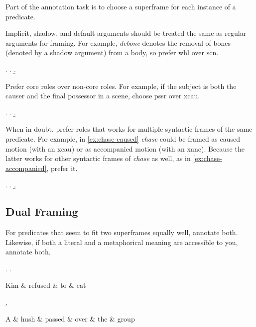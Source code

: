 \documentclass[a4paper]{article}
\begin{document}
Part of the annotation task is to choose a superframe for each instance of a predicate.

Implicit, shadow, and default arguments \citep{di-fabio-etal-2019-verbatlas} should
be treated the same as regular arguments for framing. For example,
\emph{debone} denotes the removal of bones (denoted by a shadow argument) from
a body, so prefer \textsf{whl} over \textsf{scn}.

\ex. \a. 
     \b. 


Prefer core roles over non-core roles. For example, if the subject is both the causer and the final possessor in a scene, choose \textsf{pssr} over \textsf{xcau}.

\ex. \a. 
     \b. 

When in doubt, prefer roles that works for multiple syntactic frames of the
same predicate. For example, in \ref{ex:chase-caused} \emph{chase} could be
framed as caused motion (with an \textsf{xcau}) or as accompanied motion (with
an \textsf{xanc}). Because the latter works for other syntactic frames of
\emph{chase} as well, as in \ref{ex:chase-accompanied}, prefer it.

\ex. \a. \label{ex:chase-caused} 
     \b. \label{ex:chase-accompanied} 

\subsection{Dual Framing}

For predicates that seem to fit two superframes equally well, annotate both. Likewise, if both a literal and a metaphorical meaning are accessible to you, annotate both.

\ex.
\a. \begin{dependency}
    \begin{deptext}
        Kim \& refused \& to \& eat \\
    \end{deptext}
\end{dependency}
\b. \begin{dependency}
    \begin{deptext}
        A \& hush \& passed \& over \& the \& group \\
    \end{deptext}
\end{dependency}
\end{document}
